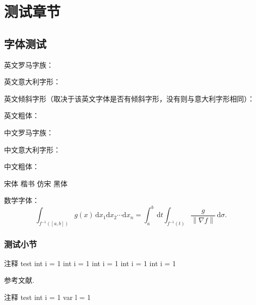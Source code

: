 \documentclass[codepkg=minted,theme=fancy,twoside]{course-report}
\begin{document}
\maketitle

\frontmatter

\tableofcontents

\mainmatter

\chapter{测试章节}
\section{字体测试}

英文罗马字族：\\
\lipsum[1]

英文意大利字形：\\
{\itshape \lipsum[1] }

英文倾斜字形（取决于该英文字体是否有倾斜字形，没有则与意大利字形相同）：\\
{\slshape \lipsum[1]}

英文粗体：\\
{\bfseries \lipsum[1]}

中文罗马字族：\\
\zhlipsum[1]

中文意大利字形：\\
{\itshape \zhlipsum[1] }

中文粗体：\\
{\bfseries \zhlipsum[1] }

{\songti 宋体} {\kaishu 楷书} {\fangsong 仿宋} {\heiti 黑体}

数学字体：
\[
    \int_{f^{ - 1}([a,b])} g(x)\,\mathrm{d}x_1\mathrm{d}x_2\cdots\mathrm{d}x_n =\int_a^b\,\mathrm{d}t\int_{f^{ - 1}(t)}\frac{g}{\left\|\nabla f\right\|}\,\mathrm{d}\sigma.
\]

\subsection{测试小节}

\zhlipsum[1-2]\zhlipsum[1]
\begin{codebox}{注释 test}\label{box:1.1}
int i = 1 
int i = 1    
int i = 1    
int i = 1    
int i = 1    
\end{codebox}
参考文献.


\begin{codebox}[minted language=csharp]{注释 test}\label{box:1.2}
    int i = 1    
    var l = 1
\end{codebox}
\end{document}
